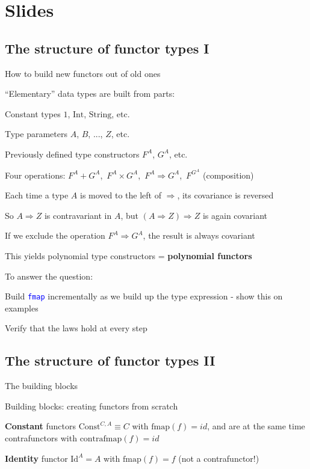 \section{Slides }

\subsection{The structure of functor types I}

How to build new functors out of old ones

``Elementary'' data types are built from parts:

Constant types $1$, $\text{Int}$, $\text{String}$, etc.

Type parameters $A$, $B$, ..., $Z$, etc.

Previously defined type constructors $F^{A}$, $G^{A}$, etc.

Four operations: $F^{A}+G^{A}$,\  $F^{A}\times G^{A}$,\  $F^{A}\Rightarrow G^{A}$,\ 
$F^{G^{A}}$ (composition)

Each time a type $A$ is moved to the left of $\Rightarrow$, its
covariance is reversed

So $A\Rightarrow Z$ is contravariant in $A$, but $\left(A\Rightarrow Z\right)\Rightarrow Z$
is again covariant

If we exclude the operation $F^{A}\Rightarrow G^{A}$, the result
is always covariant

This yields polynomial type constructors = \textbf{polynomial functors}

To answer the question:

Build \texttt{\textcolor{blue}{\footnotesize{}fmap}} incrementally
as we build up the type expression - show this on examples

Verify that the laws hold at every step


\subsection{The structure of functor types II}

The building blocks

Building blocks: creating functors from scratch

\textbf{Constant} functors $\text{Const}^{C,A}\equiv C$ with $\text{fmap}(f)=id$,
and are at the same time contrafunctors with $\text{contrafmap}(f)=id$

\textbf{Identity} functor $\text{Id}^{A}=A$ with $\text{fmap}(f)=f$
(not a contrafunctor!)

